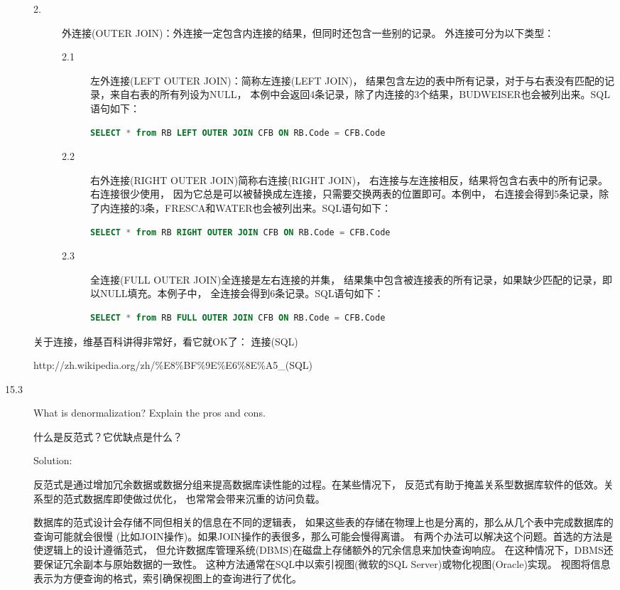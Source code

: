 \begin{description}
\begin{description}
\item[2.] 外连接(OUTER JOIN)：外连接一定包含内连接的结果，但同时还包含一些别的记录。 外连接可分为以下类型：
  \begin{description}
  \item[2.1] 左外连接(LEFT OUTER JOIN)：简称左连接(LEFT JOIN)， 结果包含左边的表中所有记录，对于与右表没有匹配的记录，来自右表的所有列设为NULL， 本例中会返回4条记录，除了内连接的3个结果，BUDWEISER也会被列出来。SQL语句如下：
    \begin{lstlisting}[language=SQL]
      SELECT * from RB LEFT OUTER JOIN CFB ON RB.Code = CFB.Code
    \end{lstlisting}
  \item[2.2] 右外连接(RIGHT OUTER JOIN)简称右连接(RIGHT JOIN)， 右连接与左连接相反，结果将包含右表中的所有记录。右连接很少使用， 因为它总是可以被替换成左连接，只需要交换两表的位置即可。本例中， 右连接会得到5条记录，除了内连接的3条，FRESCA和WATER也会被列出来。SQL语句如下：
    \begin{lstlisting}[language=SQL]
      SELECT * from RB RIGHT OUTER JOIN CFB ON RB.Code = CFB.Code
    \end{lstlisting}
  \item[2.3] 全连接(FULL OUTER JOIN)全连接是左右连接的并集， 结果集中包含被连接表的所有记录，如果缺少匹配的记录，即以NULL填充。本例子中， 全连接会得到6条记录。SQL语句如下：
    \begin{lstlisting}[language=SQL]
      SELECT * from RB FULL OUTER JOIN CFB ON RB.Code = CFB.Code
    \end{lstlisting}
  \end{description}
\end{description}
关于连接，维基百科讲得非常好，看它就OK了： 连接(SQL) 

http://zh.wikipedia.org/zh/\%E8\%BF\%9E\%E6\%8E\%A5\_(SQL)


\item[15.3] What is denormalization? Explain the pros and cons.

什么是反范式？它优缺点是什么？

Solution: 

反范式是通过增加冗余数据或数据分组来提高数据库读性能的过程。在某些情况下， 反范式有助于掩盖关系型数据库软件的低效。关系型的范式数据库即使做过优化， 也常常会带来沉重的访问负载。

数据库的范式设计会存储不同但相关的信息在不同的逻辑表， 如果这些表的存储在物理上也是分离的，那么从几个表中完成数据库的查询可能就会很慢 (比如JOIN操作)。如果JOIN操作的表很多，那么可能会慢得离谱。 有两个办法可以解决这个问题。首选的方法是使逻辑上的设计遵循范式， 但允许数据库管理系统(DBMS)在磁盘上存储额外的冗余信息来加快查询响应。 在这种情况下，DBMS还要保证冗余副本与原始数据的一致性。 这种方法通常在SQL中以索引视图(微软的SQL Server)或物化视图(Oracle)实现。 视图将信息表示为方便查询的格式，索引确保视图上的查询进行了优化。


\end{description}
